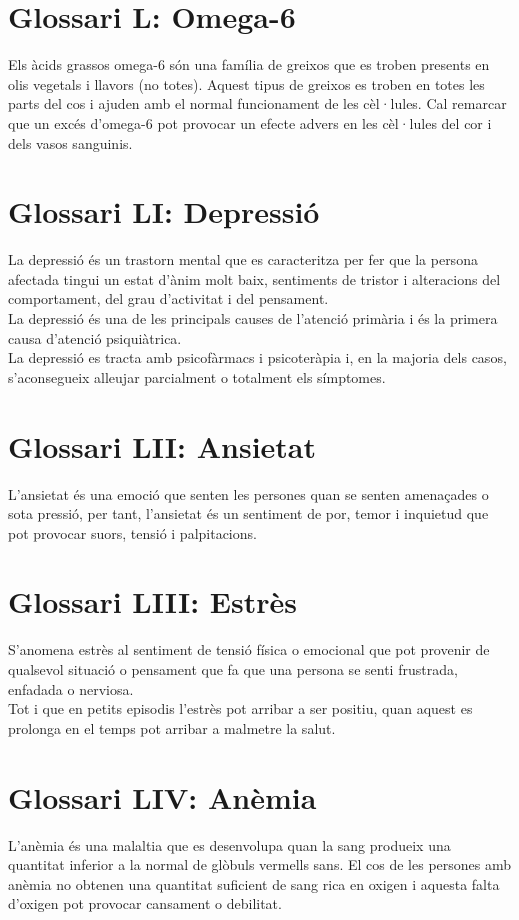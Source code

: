 \documentclass[a4paper,12pt]{report}
\begin{document}
\section*{Glossari L: Omega-6}
Els àcids grassos omega-6 són una família de greixos que es troben presents en olis vegetals i llavors (no totes). Aquest tipus de greixos es troben en totes les parts del cos i ajuden amb el normal funcionament de les cèl·lules. Cal remarcar que un excés d'omega-6 pot provocar un efecte advers en les cèl·lules del cor i dels vasos sanguinis.
\section*{Glossari LI: Depressió}
La depressió és un trastorn mental que es caracteritza per fer que la persona afectada tingui un estat d'ànim molt baix, sentiments de tristor i alteracions del comportament, del grau d'activitat i del pensament.\\
La depressió és una de les principals causes de l'atenció primària i és la primera causa d'atenció psiquiàtrica.\\
La depressió es tracta amb psicofàrmacs i psicoteràpia i, en la majoria dels casos, s'aconsegueix alleujar parcialment o totalment els símptomes.
\section*{Glossari LII: Ansietat}
L'ansietat és una emoció que senten les persones quan se senten amenaçades o sota pressió, per tant, l'ansietat és un sentiment de por, temor i inquietud que pot provocar suors, tensió i palpitacions.
\section*{Glossari LIII: Estrès}
S'anomena estrès al sentiment de tensió física o emocional que pot provenir de qualsevol situació o pensament que fa que una persona se senti frustrada, enfadada o nerviosa.\\
Tot i que en petits episodis l'estrès pot arribar a ser positiu, quan aquest es prolonga en el temps pot arribar a malmetre la salut.
\section*{Glossari LIV: Anèmia}
L'anèmia és una malaltia que es desenvolupa quan la sang produeix una quantitat inferior a la normal de glòbuls vermells sans. El cos de les persones amb anèmia no obtenen una quantitat suficient de sang rica en oxigen i aquesta falta d'oxigen pot provocar cansament o debilitat.
\end{document}
